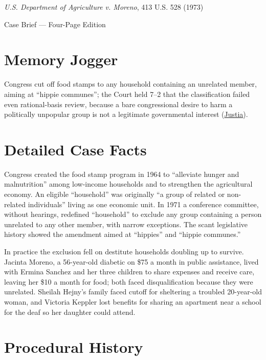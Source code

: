 \documentclass[12pt]{article}
\begin{document}
\begin{center}
{\LARGE \textit{U.S. Department of Agriculture v. Moreno}, 413 U.S. 528 (1973)\par}
\vspace{0.8em}
{\large Case Brief --- Four-Page Edition\par}
\end{center}
\vspace{1em}

\section{Memory Jogger}

Congress cut off food stamps to any household containing an unrelated member, aiming at ``hippie communes''; the Court held 7--2 that the classification failed even rational-basis review, because a bare congressional desire to harm a politically unpopular group is not a legitimate governmental interest (\href{https://supreme.justia.com/cases/federal/us/413/528/}{Justia}).

\section{Detailed Case Facts}

Congress created the food stamp program in 1964 to ``alleviate hunger and malnutrition'' among low-income households and to strengthen the agricultural economy. An eligible ``household'' was originally ``a group of related or non-related individuals'' living as one economic unit. In 1971 a conference committee, without hearings, redefined ``household'' to exclude any group containing a person unrelated to any other member, with narrow exceptions. The scant legislative history showed the amendment aimed at ``hippies'' and ``hippie communes.''

In practice the exclusion fell on destitute households doubling up to survive. Jacinta Moreno, a 56-year-old diabetic on \$75 a month in public assistance, lived with Ermina Sanchez and her three children to share expenses and receive care, leaving her \$10 a month for food; both faced disqualification because they were unrelated. Sheilah Hejny's family faced cutoff for sheltering a troubled 20-year-old woman, and Victoria Keppler lost benefits for sharing an apartment near a school for the deaf so her daughter could attend.

\section{Procedural History}
\end{document}
